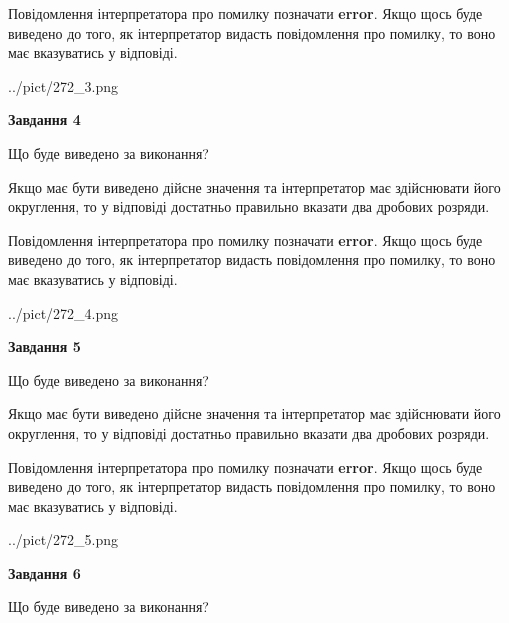 \documentclass[12pt, ukrainian]{article}
\begin{document}
{\begin {Large}
Повідомлення інтерпретатора про помилку позначати \textbf{error}.
Якщо щось буде виведено до того, як інтерпретатор видасть повідомлення про помилку, 
то воно має вказуватись у відповіді. \par

\begin{center}
	{../pict/272_3.png}
\end{center}
\newpage

{\begin {center}\textbf{Завдання 4}\end {center}}\par
Що буде виведено за виконання? \par

Якщо має бути виведено дійсне значення та інтерпретатор має здійснювати його округлення, 
то у відповіді достатньо правильно вказати два дробових розряди.

Повідомлення інтерпретатора про помилку позначати \textbf{error}.
Якщо щось буде виведено до того, як інтерпретатор видасть повідомлення про помилку, 
то воно має вказуватись у відповіді. \par

\begin{center}
	{../pict/272_4.png}
\end{center}
\newpage

{\begin {center}\textbf{Завдання 5}\end {center}}\par
Що буде виведено за виконання? \par

Якщо має бути виведено дійсне значення та інтерпретатор має здійснювати його округлення, 
то у відповіді достатньо правильно вказати два дробових розряди.

Повідомлення інтерпретатора про помилку позначати \textbf{error}.
Якщо щось буде виведено до того, як інтерпретатор видасть повідомлення про помилку, 
то воно має вказуватись у відповіді. \par

\begin{center}
	{../pict/272_5.png}
\end{center}
\newpage

{\begin {center}\textbf{Завдання 6}\end {center}}\par
Що буде виведено за виконання? \par


\end{Large}}
\end{document}
